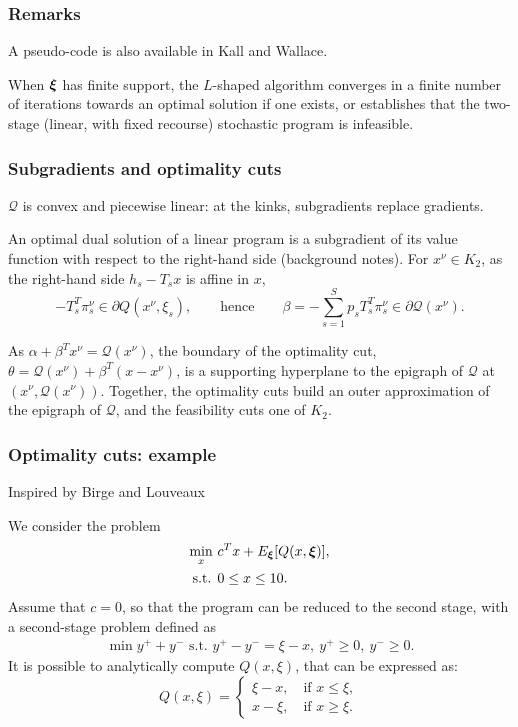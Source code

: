 \documentclass[aspectratio=169]{beamer}
\begin{document}
\begin{frame}
\frametitle{Remarks}

A pseudo-code is also available in Kall and Wallace.

\mbox{}
	
\begin{theorem}
When ${\boldsymbol{\xi}}$ has finite support, the $L$-shaped algorithm converges in a finite number of iterations towards an optimal solution if one exists, or establishes that the two-stage (linear, with fixed recourse) stochastic program is infeasible.
\end{theorem}
	
\end{frame}

\begin{frame}
	\frametitle{Subgradients and optimality cuts}
	
	$\mathcal{Q}$ is convex and piecewise linear: at the kinks, subgradients replace gradients.

	\mbox{}

	An optimal dual solution of a linear program is a subgradient of its value function with respect to the right-hand side (background notes).
	For $x^{\nu} \in K_2$, as the right-hand side $h_s-T_sx$ is affine in $x$,
	\[
	-T_s^T\pi_s^{\nu} \in \partial Q(x^{\nu}, \xi_s),
	\qquad \text{hence} \qquad
	\beta = -\textstyle\sum_{s=1}^S p_s T_s^T\pi_s^{\nu} \in \partial \mathcal{Q}(x^{\nu}).
	\]

	\mbox{}

	As $\alpha + \beta^Tx^{\nu} = \mathcal{Q}(x^{\nu})$, the boundary of the optimality cut, $\theta = \mathcal{Q}(x^{\nu}) + \beta^T(x - x^{\nu})$, is {\red a supporting hyperplane to the epigraph of $\mathcal{Q}$ at $(x^{\nu}, \mathcal{Q}(x^{\nu}))$}.
	Together, the optimality cuts build an outer approximation of the epigraph of $\mathcal{Q}$, and the feasibility cuts one of $K_2$.
	
\end{frame}

\begin{frame}
\frametitle{Optimality cuts: example}
	
{\red Inspired by Birge and Louveaux}
	
We consider the problem
\begin{align*}
\min_x\ & c^Tx + E_{{\boldsymbol{\xi}}} [ Q(x,{\boldsymbol{\xi}}) ],\\
\text{s.t. } & 0 \leq x \leq 10.
\end{align*}
Assume that $c = 0$, so that the program can be reduced to the second stage, with a second-stage problem defined as
\begin{align*}
\min y^++y^- \text{ s.t. } y^+-y^- = \xi - x,\ y^+ \geq 0,\ y^- \geq 0.
\end{align*}
It is possible to analytically compute $Q(x,\xi)$, that can be expressed as:
\[
Q(x,\xi) =
\begin{cases}
\xi - x,\quad \text{if } x \leq \xi,\\
x - \xi,\quad \text{if } x \geq \xi.
\end{cases}
\]
	
\end{frame}
\end{document}
